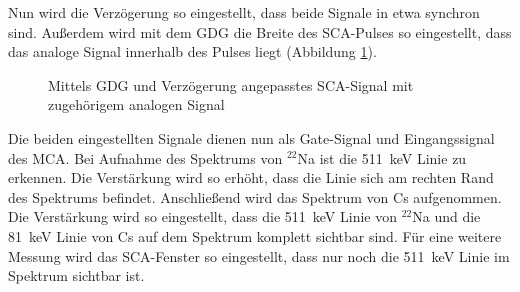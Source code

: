 Nun wird die Verzögerung so eingestellt, dass beide Signale in etwa synchron sind. Außerdem wird mit dem GDG die Breite des SCA-Pulses so eingestellt, dass das analoge Signal innerhalb des Pulses liegt (Abbildung \ref{fig:zeitliche_breite_sca_und_analog}).
\newpage
\begin{figure}[h]
  \centering
  \caption{Mittels GDG und Verzögerung angepasstes SCA-Signal mit zugehörigem analogen Signal}
  \label{fig:zeitliche_breite_sca_und_analog}
\end{figure}
Die beiden eingestellten Signale dienen nun als Gate-Signal und Eingangssignal des MCA. Bei Aufnahme des Spektrums von $^{22}$Na ist die \SI{511}{\kilo\electronvolt} Linie zu erkennen. Die Verstärkung wird so erhöht, dass die Linie sich am rechten Rand des Spektrums befindet. Anschließend wird das Spektrum von Cs aufgenommen. Die Verstärkung wird so eingestellt, dass die \SI{511}{\kilo\electronvolt} Linie von $^{22}$Na und die \SI{81}{\kilo\electronvolt} Linie von Cs auf dem Spektrum komplett sichtbar sind. Für eine weitere Messung wird das SCA-Fenster so eingestellt, dass nur noch die \SI{511}{\kilo\electronvolt} Linie im Spektrum sichtbar ist. 
\\

